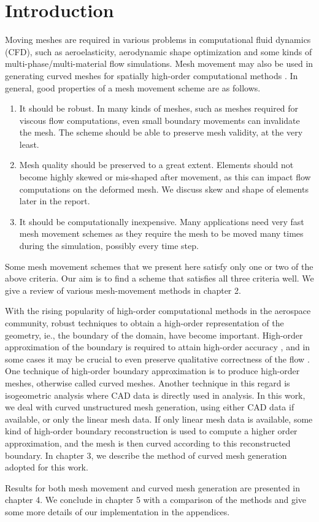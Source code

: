 \chapter{Introduction}

Moving meshes are required in various problems in computational fluid dynamics (CFD), such as aeroelasticity, aerodynamic shape optimization \cite{appl:opt} and some kinds of multi-phase/multi-material flow simulations. Mesh movement may also be used in generating curved meshes for spatially high-order computational methods \cite{curve:persson}. In general, good properties of a mesh movement scheme are as follows.
\begin{enumerate}
\item It should be robust. In many kinds of meshes, such as meshes required for viscous flow computations, even small boundary movements can invalidate the mesh. The scheme should be able to preserve mesh validity, at the very least.
\item Mesh quality should be preserved to a great extent. Elements should not become highly skewed or mis-shaped after movement, as this can impact flow computations on the deformed mesh. We discuss skew and shape of elements later in the report.
\item It should be computationally inexpensive. Many applications need very fast mesh movement schemes as they require the mesh to be moved many times during the simulation, possibly every time step.
\end{enumerate}
Some mesh movement schemes that we present here satisfy only one or two of the above criteria. Our aim is to find a scheme that satisfies all three criteria well. We give a review of various mesh-movement methods in chapter 2.

With the rising popularity of high-order computational methods in the aerospace community, robust techniques to obtain a high-order representation of the geometry, ie., the boundary of the domain, have become important. High-order approximation of the boundary is required to attain high-order accuracy \cite{curve:geomacc}, and in some cases it may be crucial to even preserve qualitative correctness of the flow \cite{appl:dgeuler}. One technique of high-order boundary approximation is to produce high-order meshes, otherwise called curved meshes. Another technique in this regard is isogeometric analysis \cite{isogeometric} where CAD data is directly used in analysis. In this work, we deal with curved unstructured mesh generation, using either CAD data if available, or only the linear mesh data. If only linear mesh data is available, some kind of high-order boundary reconstruction is used to compute a higher order approximation, and the mesh is then curved according to this reconstructed boundary. In chapter 3, we describe the method of curved mesh generation adopted for this work.

Results for both mesh movement and curved mesh generation are presented in chapter 4. We conclude in chapter 5 with a comparison of the methods and give some more details of our implementation in the appendices.
